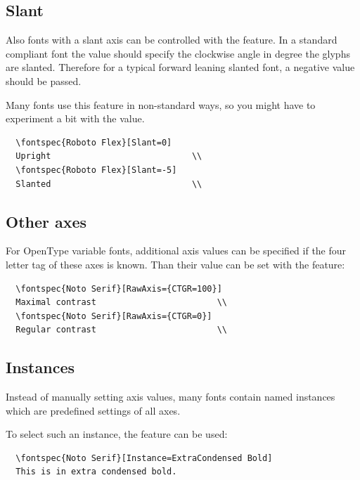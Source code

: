 \documentclass[a4paper]{l3doc}
\begin{document}
\subsection{Slant} \label{sec:variable-slant}
Also fonts with a slant axis can be controlled with the  feature.
In a standard compliant font the value should specify the clockwise angle in degree
the glyphs are slanted. Therefore for a typical forward leaning slanted font, a
negative value should be passed.

Many fonts use this feature in non-standard ways, so you might have to experiment
a bit with the value.
\begin{Verbatim}
  \fontspec{Roboto Flex}[Slant=0]
  Upright                            \\
  \fontspec{Roboto Flex}[Slant=-5]
  Slanted                            \\
\end{Verbatim}

\subsection{Other axes} \label{sec:variable-raw}
For OpenType variable fonts, additional axis values can be specified
if the four letter tag of these axes is known.
Than their value can be set with the  feature:
\begin{Verbatim}
  \fontspec{Noto Serif}[RawAxis={CTGR=100}]
  Maximal contrast                        \\
  \fontspec{Noto Serif}[RawAxis={CTGR=0}]
  Regular contrast                        \\
\end{Verbatim}

\subsection{Instances} \label{sec:variable-instances}
Instead of manually setting axis values, many fonts contain named instances which are predefined settings of all axes.

To select such an instance, the  feature can be used:
\begin{Verbatim}
  \fontspec{Noto Serif}[Instance=ExtraCondensed Bold]
  This is in extra condensed bold.
\end{Verbatim}
\end{document}
